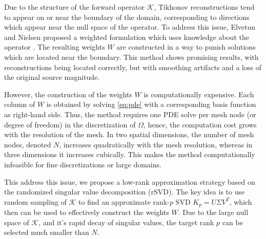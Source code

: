 Due to the structure of the forward operator $\mathcal K$, Tikhonov reconstructions tend to appear on or near the boundary of the domain, corresponding to directions which appear near the null space of the operator. To address this issue, Elvetun and Nielsen proposed a weighted formulation which uses knowledge about the operator \cite{elvetunRegularizationOperatorSource2020}. The resulting weights $W$ are constructed in a way to punish solutions which are located near the boundary. This method shows promising results, with reconstructions being located correctly, but with smoothing artifacts and a loss of the original source magnitude.

However, the construction of the weights $W$ is computationally expensive. Each column of $W$ is obtained by solving \eqref{eq:pde} with a corresponding basis function as right-hand side. Thus, the method requires one PDE solve per mesh node (or degree of freedom) in the discretization of $\Omega$, hence, the computation cost grows with the resolution of the mesh. In two spatial dimensions, the number of mesh nodes, denoted $N$, increases quadratically with the mesh resolution, whereas in three dimensions it increases cubically. This makes the method computationally infeasible for fine discretizations or large domains.

This address this issue, we propose a low-rank approximation strategy based on the randomized singular value decomposition (rSVD). The key idea is to use random sampling of $\mathcal{K}$ to find an approximate rank-$p$ SVD $K_p = U \Sigma V^T$, which then can be used to effectively construct the weights $W$. Due to the large null space of $\mathcal{K}$, and it's rapid decay of singular values, the target rank $p$ can be selected much smaller than $N$.


